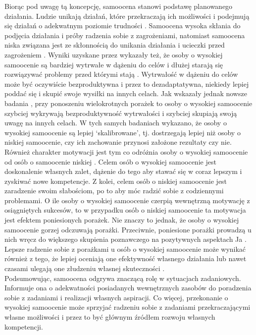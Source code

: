 \documentclass[man]{apa6}
\begin{document}
Biorąc pod uwagę tą koncepcję, samoocena stanowi podstawę planowanego działania. Ludzie unikają działań, które przekraczają ich możliwości i podejmują się działań o adekwatnym poziomie trudności \parencite{bandura1977self}. Samoocena wysoka skłania do podjęcia działania i próby radzenia sobie z zagrożeniami, natomiast samoocena niska związana jest ze skłonnością do unikania działania i ucieczki przed zagrożeniem \parencite{bednar1989self}. Wyniki uzyskane przez \textcite{mcfarlin1984knowing} wykazały też, że osoby o wysokiej samoocenie są bardziej wytrwałe w dążeniu do celów i dłużej starają się rozwiązywać problemy przed którymi stają \parencite[zob. również ][]{baumeister1993ego}. Wytrwałość w dążeniu do celów może być oczywiście bezproduktywna i przez to dezadaptatywna, niekiedy lepiej poddać się i skupić swoje wysiłki na innych celach. Jak wskazały jednak nowsze badania \parencite{di2002self}, przy ponoszeniu wielokrotnych porażek to osoby o wysokiej samoocenie szybciej wykrywają bezproduktywność wytrwałości i szybciej skupiają swoją uwagę na innych celach. W tych samych badaniach wykazano, że osoby o wysokiej samoocenie są lepiej `skalibrowane', tj. dostrzegają lepiej niż osoby o niskiej samoocenie, czy ich zachowanie przynosi założone rezultaty czy nie.\\

Również charakter motywacji jest tym co odróżnia osoby o wysokiej samoocenie od osób o samoocenie niskiej \parencite{baumeister1985self}. Celem osób o wysokiej samoocenie jest doskonalenie własnych zalet, dążenie do tego aby stawać się w coraz lepszym i zyskiwać nowe kompetencje. Z kolei, celem osób o niskiej samoocenie jest zaradzenie swoim słabościom, po to aby móc radzić sobie z codziennymi problemami. O ile osoby o wysokiej samoocenie czerpią wewnętrzną motywację z osiągniętych sukcesów, to w przypadku osób o niskiej samoocenie ta motywacja jest efektem poniesionych porażek. Nie znaczy to jednak, że osoby o wysokiej samoocenie gorzej odczuwają porażki. Przeciwnie, poniesione porażki prowadzą u nich wręcz do większego skupienia poznawczego na pozytywnych aspektach Ja \parencite{dodgson1998self}. Lepsze radzenie sobie z porażkami u osób o wysokiej samoocenie może wynikać również z tego, że lepiej oceniają one efektywność własnego działania lub nawet czasami ulegają one złudzeniu własnej skuteczności \parencite{alloy1979judgment}.\\

Podsumowując, samoocena odgrywa znaczącą rolę w sytuacjach zadaniowych. Informuje ona o adekwatności posiadanych wewnętrznych zasobów do poradzenia sobie z zadaniami i realizacji własnych aspiracji. Co więcej, przekonanie o wysokiej samoocenie może sprzyjać radzeniu sobie z zadaniami przekraczającymi własne możliwości i przez to być głównym źródłem rozwoju własnych kompetencji.
\end{document}
